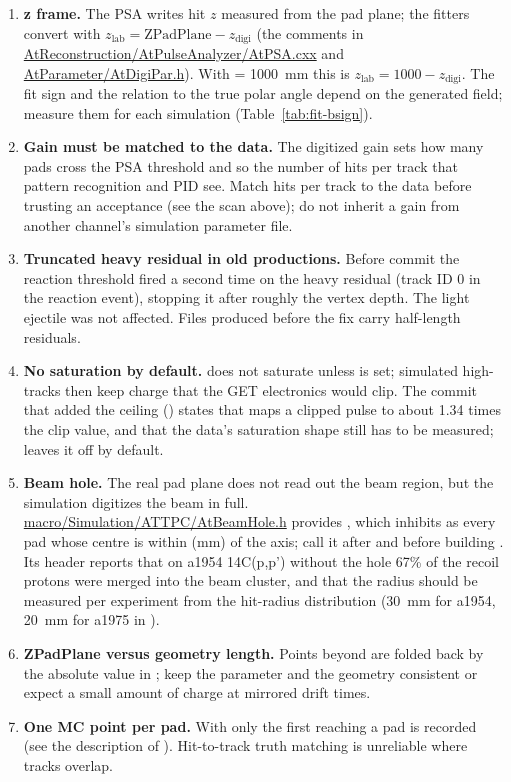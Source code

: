 \begin{enumerate}
  \item \textbf{z frame.} The PSA writes hit $z$ measured from the pad plane; the fitters convert
    with $z_\mathrm{lab} = \mathrm{ZPadPlane} - z_\mathrm{digi}$ (the comments in
    \url{AtReconstruction/AtPulseAnalyzer/AtPSA.cxx} and \url{AtParameter/AtDigiPar.h}). With
     = 1000~mm this is $z_\mathrm{lab} = 1000 - z_\mathrm{digi}$. The fit sign and the
    relation to the true polar angle depend on the generated field; measure them for each simulation
    (Table~\ref{tab:fit-bsign}).
  \item \textbf{Gain must be matched to the data.} The digitized gain sets how many pads cross the
    PSA threshold and so the number of hits per track that pattern recognition and PID see. Match
    hits per track to the data before trusting an acceptance (see the scan above); do not inherit a
    gain from another channel's simulation parameter file.
  \item \textbf{Truncated heavy residual in old productions.} Before commit 
    the reaction threshold fired a second time on the heavy residual (track ID 0 in the reaction
    event), stopping it after roughly the vertex depth. The light ejectile was not affected. Files
    produced before the fix carry half-length residuals.
  \item \textbf{No saturation by default.}  does not saturate unless
     is set; simulated high-\dedx{} tracks then keep charge that the GET
    electronics would clip. The commit that added the ceiling () states that
     maps a clipped pulse to about 1.34 times the clip value, and that the data's
    saturation shape still has to be measured;  leaves it off by default.
  \item \textbf{Beam hole.} The real pad plane does not read out the beam region, but the
    simulation digitizes the beam in full. \url{macro/Simulation/ATTPC/AtBeamHole.h} provides
    , which inhibits as  every pad whose centre
    is within  (mm) of the axis; call it after  and before
    building . Its header reports that on a1954 14C(p,p') without the hole 67\% of the
    recoil protons were merged into the beam cluster, and that the radius should be measured per
    experiment from the hit-radius distribution (30~mm for a1954, 20~mm for a1975 in
    ).
  \item \textbf{ZPadPlane versus geometry length.} Points beyond  are folded back by
    the absolute value in ; keep the parameter and the geometry consistent or
    expect a small amount of charge at mirrored drift times.
  \item \textbf{One MC point per pad.} With  only the first 
    reaching a pad is recorded (see the description of ). Hit-to-track truth
    matching is unreliable where tracks overlap.
\end{enumerate}
